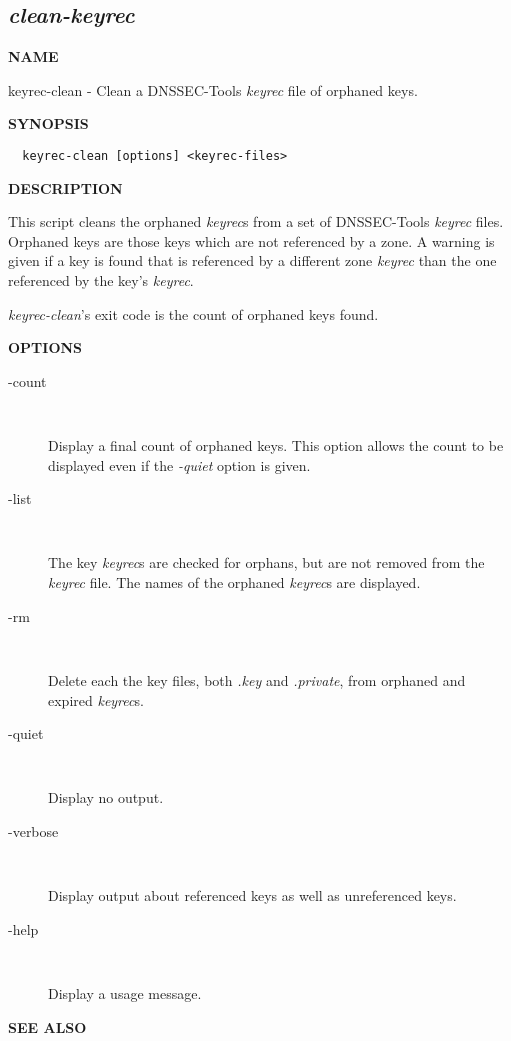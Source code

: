\clearpage

\subsection{{\it clean-keyrec}}


{\bf NAME}

keyrec-clean - Clean a DNSSEC-Tools {\it keyrec} file of orphaned keys.

{\bf SYNOPSIS}

\begin{verbatim}
  keyrec-clean [options] <keyrec-files>
\end{verbatim}

{\bf DESCRIPTION}

This script cleans the orphaned {\it keyrec}s from a set of DNSSEC-Tools
{\it keyrec} files.  Orphaned keys are those keys which are not referenced
by a zone.  A warning is given if a key is found that is referenced by a
different zone {\it keyrec} than the one referenced by the key's {\it keyrec}.

{\it keyrec-clean}'s exit code is the count of orphaned keys found.

{\bf OPTIONS}

\begin{description}

\item [-count]\verb" "

Display a final count of orphaned keys.  This option allows the count to be
displayed even if the {\it -quiet} option is given.

\item [-list]\verb" "

The key {\it keyrec}s are checked for orphans, but are not removed from the
{\it keyrec} file.  The names of the orphaned {\it keyrec}s are displayed.

\item [-rm]\verb" "

Delete each the key files, both {\it .key} and {\it .private}, from orphaned and
expired {\it keyrec}s.

\item [-quiet]\verb" "

Display no output.

\item [-verbose]\verb" "

Display output about referenced keys as well as unreferenced keys.

\item [-help]\verb" "

Display a usage message.

\end{description}

{\bf SEE ALSO}


